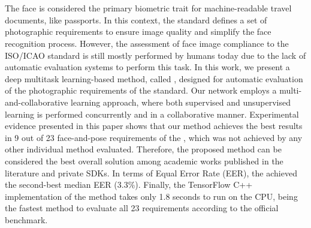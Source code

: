 \section*{}

The face is considered the primary biometric trait for machine-readable travel documents, like passports. In this context, the \icao standard defines a set of photographic requirements to ensure image quality and simplify the face recognition process. However, the assessment of face image compliance to the ISO/ICAO standard is still mostly performed by humans today due to the lack of automatic evaluation systems to perform this task. In this work, we present a deep multitask learning-based method, called \methodname, designed for automatic evaluation of the photographic requirements of the \icao standard. Our network employs a multi-and-collaborative learning approach, where both supervised and unsupervised learning is performed concurrently and in a collaborative manner. Experimental evidence presented in this paper shows that our method achieves the best results in 9 out of 23 face-and-pose requirements of the \icao, which was not achieved by any other individual method evaluated. Therefore, the proposed method can be considered the best overall solution among academic works published in the literature and private SDKs. In terms of Equal Error Rate (EER), the \methodname achieved the second-best median EER (3.3\%). Finally, the TensorFlow C++ implementation of the method takes only 1.8 seconds to run on the CPU, being the fastest method to evaluate all 23 requirements according to the official benchmark.

\newpage